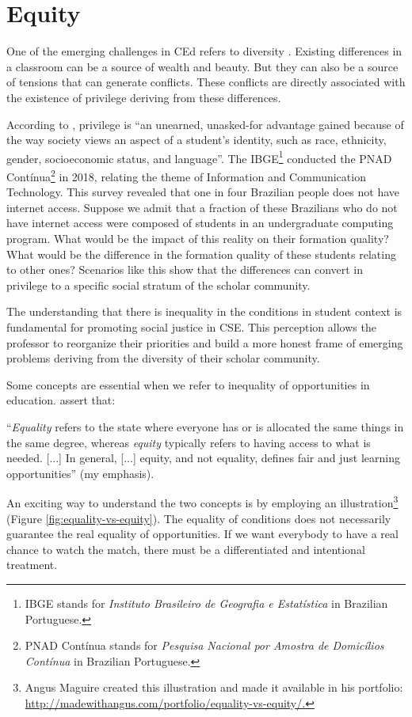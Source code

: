 \chapter{Equity}
\label{chap:equity}

 One of the emerging challenges in \gls{CEd} refers to diversity \cite[p.~19:2]{burgstahler:2011}. Existing differences in a classroom can be a source of wealth and beauty. But they can also be a source of tensions that can generate conflicts. These conflicts are directly associated with the existence of privilege deriving from these differences.
 
According to , privilege is “an unearned, unasked-for advantage gained because of the way society views an aspect of a student’s identity, such as race, ethnicity, gender, socioeconomic status, and language”. The \gls{IBGE}\footnote{IBGE stands for \textit{Instituto Brasileiro de Geografia e Estatística} in Brazilian Portuguese.} conducted the \gls{PNAD Contínua}\footnote{PNAD Contínua stands for \textit{Pesquisa Nacional por Amostra de Domicílios Contínua} in Brazilian Portuguese.} in 2018, relating the theme of Information and Communication Technology. This survey revealed that one in four Brazilian people does not have internet access. Suppose we admit that a fraction of these Brazilians who do not have internet access were composed of students in an undergraduate computing program. What would be the impact of this reality on their formation quality? What would be the difference in the formation quality of these students relating to other ones? Scenarios like this show that the differences can convert in privilege to a specific social stratum of the scholar community.

The understanding that there is inequality in the conditions in student context is fundamental for promoting social justice in \gls{CSE}. This perception allows the professor to reorganize their priorities and build a more honest frame of emerging problems deriving from the diversity of their scholar community.

Some concepts are essential when we refer to inequality of opportunities in education.  assert that:
\begin{citacao}
    “\textit{Equality} refers to the state where everyone has or is allocated the same things in the same degree, whereas \textit{equity} typically refers to having access to what is needed. [...] In general, [...] equity, and not equality, defines fair and just learning opportunities” (my emphasis).
\end{citacao}
An exciting way to understand the two concepts is by employing an illustration\footnote{Angus Maguire created this illustration and made it available in his portfolio: \url{http://madewithangus.com/portfolio/equality-vs-equity/.}} (Figure \ref{fig:equality-vs-equity}). The equality of conditions does not necessarily guarantee the real equality of opportunities. If we want everybody to have a real chance to watch the match, there must be a differentiated and intentional treatment. 

